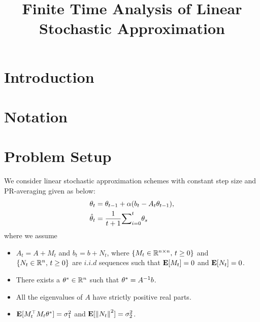 \documentclass{article}
\title{Finite Time Analysis of Linear Stochastic Approximation}
\author{
}
\begin{document}

\maketitle
\begin{abstract}

\end{abstract}

\section{Introduction}
\section{Notation}

\section{Problem Setup}
We consider linear stochastic approximation schemes with constant step size and PR-averaging given as below:
\begin{align}
\theta_t&=\theta_{t-1}+\alpha(b_t-A_t\theta_{t-1}),\\
\hat{\theta}_t&=\frac{1}{t+1}{\sum}_{i=0}^{t}\theta_s
\end{align}
where we assume
\begin{assumption}\label{lsa}
\begin{itemize}[leftmargin=*, before = \leavevmode\vspace{-\baselineskip}]
\item $A_t=A+M_t$ and $b_t=b+N_t$, where $\{M_t \in \mathbb{R}^{n\times n},\,t\geq 0\}$ and $\{N_t\in\mathbb{R}^n,\,t\geq 0\}$ are $i.i.d$ sequences such that $\mathbf{E}[M_t]=0$ and $\mathbf{E}[N_t]=0$.
\item There exists a $\theta^*\in \mathbb{R}^n$ such that $\theta^*=A^{-1}b$.
\item All the eigenvalues of $A$ have strictly positive real parts.
\item $\mathbf{E}[M_t^\top M_t\theta^*]=\sigma_1^2$ and $\mathbf{E}[\left\| N_t\right\|^2]=\sigma_2^2$.
\end{itemize}
\end{assumption}
\begin{example}
\end{example}

\begin{example}[TD(0)]
\end{example}
\end{document}
